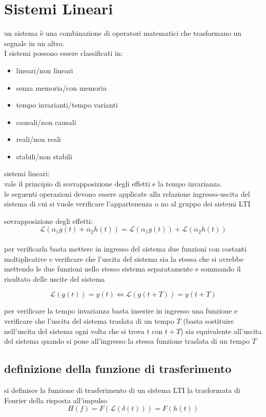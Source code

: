 \documentclass{article}
\begin{document}
\section{Sistemi Lineari}
un sistema è una combinazione di operatori matematici che trasformano un segnale in un altro.\\
I sistemi possono essere classificati in:
\begin{itemize}
\item lineari/non lineari
\item senza memoria/con memoria
\item tempo invarianti/tempo varianti
\item causali/non causali
\item reali/non reali
\item stabili/non stabili
\end{itemize}


sistemi lineari:\\
vale il principio di sovrapposizione degli effetti e la tempo invarianza.\\
le seguenti operazioni devono essere applicate alla relazione ingresso-uscita del sistema di cui si vuole
verificare l'appartenenza o no al gruppo dei sistemi LTI

sovrapposizione degli effetti:
$$\mathcal{L} (\alpha_1 g(t) + \alpha_2 h(t)) = \mathcal{L} (\alpha_1 g(t)) + \mathcal{L} (\alpha_2 h(t)) $$
\\
per verificarla basta mettere in ingresso del sistema due funzioni con costanti moltiplicative e verificare che l'uscita del sistema sia la stessa che si avrebbe mettendo le due funzioni nello stesso sistema separatamente e sommando il risultato delle uscite del sistema

$$\mathcal{L} (g(t)) = y(t) \Leftrightarrow \mathcal{L} (g(t + T)) = y(t + T) $$

per verificare la tempo invarianza basta inserire in ingresso una funzione e verificare che l'uscita del sistema traslata di un tempo $T$ (basta sostituire nell'uscita del sistema ogni volta che si trova $t$ con $t + T$) sia equivalente all'uscita del sistema quando si pone all'ingresso la stessa funzione traslata di un tempo $T$



\subsection{definizione della funzione di trasferimento}
si definisce la funzione di trasferimento di un sistema LTI la trasformata di Fourier della risposta all'impulso
$$H(f) = F(\mathcal{L}(\delta(t))) = F(h(t))$$
\end{document}
